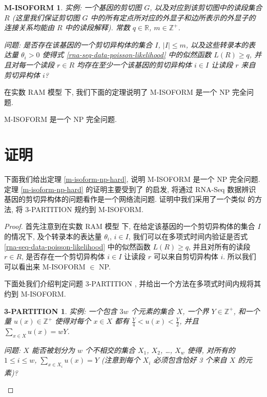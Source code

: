 \newtheorem*{misof}{M-ISOFORM}

\begin{misof}
\hspace*{1mm}

实例: 一个基因的剪切图 $G$, 以及对应到该剪切图中的读段集合 $R$ 
(这里我们保证剪切图 $G$ 中的所有定点所对应的外显子和边所表示的外显子的连接关系均能由 
$R$ 中的读段解释). 常数 $q \in \mathbb{R}$, $m \in \mathbb{Z}^+$. 

问题: 是否存在该基因的一个剪切异构体的集合 $I$, $|I| \leq m$, 
以及这些转录本的表达量 $\theta_i > 0$
使得式 \eqref{rna-seq-data-poisson-likelihood} 中的似然函数 $L(R) \geq q$, 
并且对每一个读段 $r \in R$ 均存在至少一个该基因的剪切异构体 $i\in I$ 
让读段 $r$ 来自剪切异构体 $i$?
\end{misof}

在实数 RAM 模型 \cite{Preparata:1985:CGI:4333} 下, 
我们下面的定理说明了 M-ISOFORM 是一个 NP 完全问题. 

\begin{thm}
\label{m-isoform-np-hard}
M-ISOFORM 是一个 NP 完全问题.
\end{thm}

\section{证明}

下面我们给出定理 \ref{m-isoform-np-hard}, 说明 M-ISOFORM 是一个 NP 完全问题. 
定理 \ref{m-isoform-np-hard} 的证明主要受到了  的启发, 
将通过 RNA-Seq 数据辨识基因的剪切异构体的问题看作是一个网络流问题. 
证明中我们采用了一个类似  的方法, 
将 3-PARTITION \cite{doi:10.1137/0204035, Garey:1990:CIG:574848} 规约到 M-ISOFORM. 

\begin{proof}
首先注意到在实数 RAM 模型 \cite{Preparata:1985:CGI:4333} 下, 
在给定该基因的一个剪切异构体的集合 $I$ 的情况下, 及个转录本的表达量 $\theta_i$, $i\in I$, 
我们可以在多项式时间内验证是否式 \eqref{rna-seq-data-poisson-likelihood} 中的似然函数 $L(R) \geq q$, 
并且对所有的读段 $r\in R$, 
是否存在一个剪切异构体 $i\in I$ 让读段 $r$ 可以来自剪切异构体 $i$. 
所以我们可以看出来 M-ISOFORM $\in$ NP. 

下面处我们介绍判定问题 3-PARTITION \cite{doi:10.1137/0204035, Garey:1990:CIG:574848}, 
并给出一个方法在多项式时间内规将其约到 M-ISOFORM. 

\newtheorem*{tripart}{3-PARTITION}

\begin{tripart}
\hspace*{1mm}

实例: 一个包含 $3w$ 个元素的集合 $X$, 一个界 $Y \in \mathbb{Z}^+$, 
和一个量 $u(x) \in \mathbb{Z}^+$ 使得对每个 $x \in X$ 
都有 $\frac{Y}{4} < u(x) < \frac{Y}{2}$, 
并且 $\sum_{x \in X} u(x) = w Y$.

问题: $X$ 能否被划分为 $w$ 个不相交的集合 $X_1$, $X_2$, \ldots, $X_w$ 使得, 
对所有的 $1 \leq i \leq w$, $\sum_{x \in X_i} u(x) = Y$ 
(注意到每个 $X_i$ 必须包含恰好 3 个来自 $X$ 的元素)?
\end{tripart}
\end{proof}


